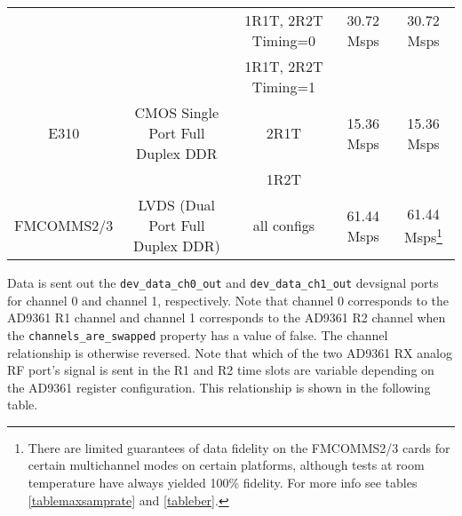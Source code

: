 \documentclass{article}
\begin{document}
\begin{sloppypar}
\begin{scriptsize}
\begin{longtable}{|c|c|c|c|c|}
    \hline
         &                           & 1R1T, 2R2T Timing=0 & 30.72 Msps & 30.72 Msps \\
    \cline{2-5}
         &                           & 1R1T, 2R2T Timing=1 &            &            \\
    E310 & CMOS Single Port Full Duplex DDR & 2R1T                & 15.36 Msps & 15.36 Msps \\
         &                           & 1R2T                &            &            \\
    \hline
    FMCOMMS2/3 & LVDS (Dual Port Full Duplex DDR) & all configs         & 61.44 Msps & 61.44 Msps\footnote{There are limited guarantees of data fidelity on the FMCOMMS2/3 cards for certain multichannel modes on certain platforms, although tests at room temperature have always yielded 100\% fidelity. For more info see tables \ref{tablemaxsamprate} and \ref{tableber}.} \\
    \hline
	\end{longtable}
\end{scriptsize}
\noindent Data is sent out the \verb+dev_data_ch0_out+ and \verb+dev_data_ch1_out+ devsignal ports for channel 0 and channel 1, respectively. Note that channel 0 corresponds to the AD9361 R1 channel and channel 1 corresponds to the AD9361 R2 channel when the \verb+channels_are_swapped+ property has a value of false. The channel relationship is otherwise reversed. Note that which of the two AD9361 RX analog RF port's signal is sent in the R1 and R2 time slots are variable depending on the AD9361 register configuration. This relationship is shown in the following table.
\end{sloppypar}
\end{document}
